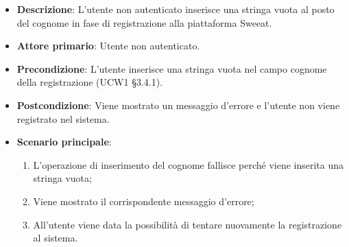 \begin{itemize}
\item \textbf{Descrizione}: L'utente non autenticato inserisce una stringa vuota al posto del cognome in fase di registrazione alla piattaforma Sweeat.
\item \textbf{Attore primario}: Utente non autenticato.
\item \textbf{Precondizione}: L'utente inserisce una stringa vuota nel campo cognome della registrazione (UCW1 §3.4.1).
\item \textbf{Postcondizione}: Viene mostrato un messaggio d'errore e l'utente non viene registrato nel sistema.

\item \textbf{Scenario principale}:
\begin{enumerate}
\item L'operazione di inserimento del cognome fallisce perché viene inserita una stringa vuota;
\item Viene mostrato il corrispondente messaggio d'errore;
\item All'utente viene data la possibilità di tentare nuovamente la registrazione al sistema.
\end{enumerate}
\end{itemize}